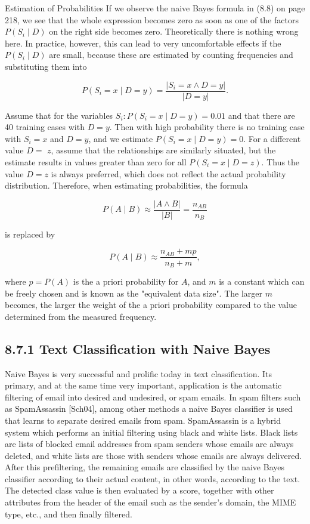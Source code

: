 \documentclass[10pt]{article}
\begin{document}
Estimation of Probabilities If we observe the naive Bayes formula in (8.8) on page 218, we see that the whole expression becomes zero as soon as one of the factors $P\left(S_{i} \mid D\right)$ on the right side becomes zero. Theoretically there is nothing wrong here. In practice, however, this can lead to very uncomfortable effects if the $P\left(S_{i} \mid D\right)$ are small, because these are estimated by counting frequencies and substituting them into

$$
P\left(S_{i}=x \mid D=y\right)=\frac{\left|S_{i}=x \wedge D=y\right|}{|D=y|} .
$$

Assume that for the variables $S_{i}: P\left(S_{i}=x \mid D=y\right)=0.01$ and that there are 40 training cases with $D=y$. Then with high probability there is no training case with $S_{i}=x$ and $D=y$, and we estimate $P\left(S_{i}=x \mid D=y\right)=0$. For a different value $D=$ $z$, assume that the relationships are similarly situated, but the estimate results in values greater than zero for all $P\left(S_{i}=x \mid D=z\right)$. Thus the value $D=z$ is always preferred, which does not reflect the actual probability distribution. Therefore, when estimating probabilities, the formula

$$
P(A \mid B) \approx \frac{|A \wedge B|}{|B|}=\frac{n_{A B}}{n_{B}}
$$

is replaced by

$$
P(A \mid B) \approx \frac{n_{A B}+m p}{n_{B}+m},
$$

where $p=P(A)$ is the a priori probability for $A$, and $m$ is a constant which can be freely chosen and is known as the "equivalent data size". The larger $m$ becomes, the larger the weight of the a priori probability compared to the value determined from the measured frequency.

\subsection*{8.7.1 Text Classification with Naive Bayes}
Naive Bayes is very successful and prolific today in text classification. Its primary, and at the same time very important, application is the automatic filtering of email into desired and undesired, or spam emails. In spam filters such as SpamAssassin [Sch04], among other methods a naive Bayes classifier is used that learns to separate desired emails from spam. SpamAssassin is a hybrid system which performs an initial filtering using black and white lists. Black lists are lists of blocked email addresses from spam senders whose emails are always deleted, and white lists are those with senders whose emails are always delivered. After this prefiltering, the remaining emails are classified by the naive Bayes classifier according to their actual content, in other words, according to the text. The detected class value is then evaluated by a score, together with other attributes from the header of the email such as the sender's domain, the MIME type, etc., and then finally filtered.
\end{document}
